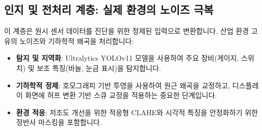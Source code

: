 \subsection{인지 및 전처리 계층: 실제 환경의 노이즈 극복}
이 계층은 원시 센서 데이터를 진단을 위한 정제된 입력으로 변환합니다.
산업 환경 고유의 노이즈와 기하학적 왜곡을 처리합니다:
\begin{itemize}
    \item \textbf{탐지 및 지역화}: Ultralytics YOLOv11 모델을 사용하여 주요 장비(게이지, 스위치) 및 보조 특징(바늘, 눈금 표시)을 탐지합니다.
    \item \textbf{기하학적 정제}: 호모그래피 기반 투영을 사용하여 원근 왜곡을 교정하고, 디스플레이 화면에 허프 변환 기반 스큐 교정을 적용하는 중요한 단계입니다.
    \item \textbf{환경 적응}: 저조도 개선을 위한 적응형 CLAHE와 시각적 특징을 안정화하기 위한 정반사 마스킹을 포함합니다.
\end{itemize}

